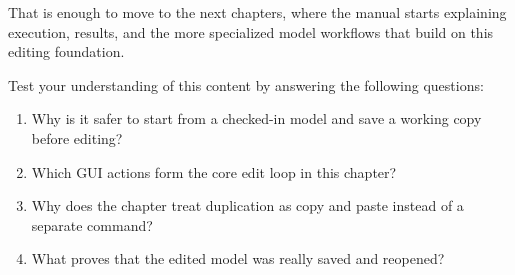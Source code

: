That is enough to move to the next chapters, where the manual starts explaining execution, results, and
the more specialized model workflows that build on this editing foundation.

Test your understanding of this content by answering the following questions:

\begin{enumerate}
\item Why is it safer to start from a checked-in model and save a working copy before editing?

\item Which GUI actions form the core edit loop in this chapter?

\item Why does the chapter treat duplication as copy and paste instead of a separate command?

\item What proves that the edited model was really saved and reopened?
\end{enumerate}
